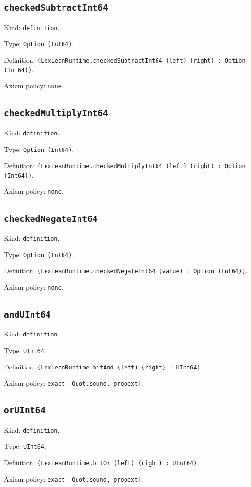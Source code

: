 \documentclass[11pt]{article}
\begin{document}
\subsection*{\texttt{checkedSubtractInt64}}
\noindent Kind: \texttt{definition}.\par
\noindent Type: \texttt{Option (Int64)}.\par
\noindent Definition: \texttt{(LexLeanRuntime.checkedSubtractInt64 (left) (right) : Option (Int64))}.\par
\noindent Axiom policy: \texttt{none}.\par
\subsection*{\texttt{checkedMultiplyInt64}}
\noindent Kind: \texttt{definition}.\par
\noindent Type: \texttt{Option (Int64)}.\par
\noindent Definition: \texttt{(LexLeanRuntime.checkedMultiplyInt64 (left) (right) : Option (Int64))}.\par
\noindent Axiom policy: \texttt{none}.\par
\subsection*{\texttt{checkedNegateInt64}}
\noindent Kind: \texttt{definition}.\par
\noindent Type: \texttt{Option (Int64)}.\par
\noindent Definition: \texttt{(LexLeanRuntime.checkedNegateInt64 (value) : Option (Int64))}.\par
\noindent Axiom policy: \texttt{none}.\par
\subsection*{\texttt{andUInt64}}
\noindent Kind: \texttt{definition}.\par
\noindent Type: \texttt{UInt64}.\par
\noindent Definition: \texttt{(LexLeanRuntime.bitAnd (left) (right) : UInt64)}.\par
\noindent Axiom policy: \texttt{exact [Quot.sound, propext]}.\par
\subsection*{\texttt{orUInt64}}
\noindent Kind: \texttt{definition}.\par
\noindent Type: \texttt{UInt64}.\par
\noindent Definition: \texttt{(LexLeanRuntime.bitOr (left) (right) : UInt64)}.\par
\noindent Axiom policy: \texttt{exact [Quot.sound, propext]}.\par
\end{document}
